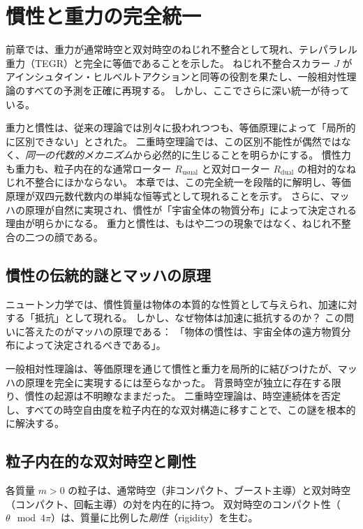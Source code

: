 \documentclass[dvipdfmx,a4paper]{jsbook}
\theoremstyle{definition}
\theoremstyle{remark}
\begin{document}
\chapter{慣性と重力の完全統一}
\label{chap:inertia-gravity-unification}

前章では、重力が通常時空と双対時空のねじれ不整合として現れ、テレパラレル重力（TEGR）と完全に等価であることを示した。  
ねじれ不整合スカラー $J$ がアインシュタイン・ヒルベルトアクションと同等の役割を果たし、一般相対性理論のすべての予測を正確に再現する。  
しかし、ここでさらに深い統一が待っている。  

重力と慣性は、従来の理論では別々に扱われつつも、等価原理によって「局所的に区別できない」とされた。  
二重時空理論では、この区別不能性が偶然ではなく、\emph{同一の代数的メカニズム}から必然的に生じることを明らかにする。  
慣性力も重力も、粒子内在的な通常ローター $R_\text{usual}$ と双対ローター $R_\text{dual}$ の相対的なねじれ不整合にほかならない。  
本章では、この完全統一を段階的に解明し、等価原理が双四元数代数内の単純な恒等式として現れることを示す。  
さらに、マッハの原理が自然に実現され、慣性が「宇宙全体の物質分布」によって決定される理由が明らかになる。  
重力と慣性は、もはや二つの現象ではなく、ねじれ不整合の二つの顔である。

\section{慣性の伝統的謎とマッハの原理}
\label{sec:mach-principle}

ニュートン力学では、慣性質量は物体の本質的な性質として与えられ、加速に対する「抵抗」として現れる。  
しかし、なぜ物体は加速に抵抗するのか？  
この問いに答えたのがマッハの原理である：  
「物体の慣性は、宇宙全体の遠方物質分布によって決定されるべきである」。  

一般相対性理論は、等価原理を通じて慣性と重力を局所的に結びつけたが、マッハの原理を完全に実現するには至らなかった。  
背景時空が独立に存在する限り、慣性の起源は不明瞭なままだった。  
二重時空理論は、時空連続体を否定し、すべての時空自由度を粒子内在的な双対構造に移すことで、この謎を根本的に解決する。

\section{粒子内在的な双対時空と剛性}
\label{sec:intrinsic-rigidity}

各質量 $m > 0$ の粒子は、通常時空（非コンパクト、ブースト主導）と双対時空（コンパクト、回転主導）の対を内在的に持つ。  
双対時空のコンパクト性（$\theta \mod 4\pi$）は、質量に比例した\emph{剛性}（rigidity）を生む。  
\end{document}
